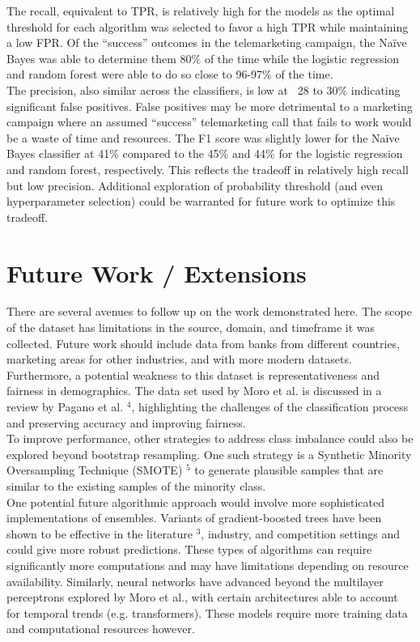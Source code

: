 \documentclass[11pt]{article}
\begin{document}
The recall, equivalent to TPR, is relatively high for the models as the optimal threshold for each algorithm was selected to favor a high TPR while maintaining a low FPR. Of the “success” outcomes in the telemarketing campaign, the Naïve Bayes was able to determine them 80\% of the time while the logistic regression and random forest were able to do so close to 96-97\% of the time. \\

The precision, also similar across the classifiers, is low at ~28 to 30\% indicating significant false positives. False positives may be more detrimental to a marketing campaign where an assumed “success” telemarketing call that fails to work would be a waste of time and resources. The F1 score was slightly lower for the Naïve Bayes classifier at 41\% compared to the 45\% and 44\% for the logistic regression and random forest, respectively. This reflects the tradeoff in relatively high recall but low precision. Additional exploration of probability threshold (and even hyperparameter selection) could be warranted for future work to optimize this tradeoff. 

\section{Future Work / Extensions }
\label{SS:6}
There are several avenues to follow up on the work demonstrated here. The scope of the dataset has limitations in the source, domain, and timeframe it was collected. Future work should include data from banks from different countries, marketing areas for other industries, and with more modern datasets. Furthermore, a potential weakness to this dataset is representativeness and fairness in demographics. The data set used by Moro et al. is discussed in a review by Pagano et al. $^4$, highlighting the  challenges of the classification process and preserving accuracy and improving fairness.\\

To improve performance, other strategies to address class imbalance could also be explored beyond bootstrap resampling. One such strategy is a Synthetic Minority Oversampling Technique (SMOTE) $^5$ to generate plausible samples that are similar to the existing samples of the minority class. \\


One potential future algorithmic approach would involve more sophisticated implementations of ensembles. Variants of gradient-boosted trees have been shown to be effective in the literature $^3$, industry, and competition settings and could give more robust predictions. These types of algorithms can require significantly more computations and may have limitations depending on resource availability. Similarly, neural networks have advanced beyond the multilayer perceptrons explored by Moro et al., with certain architectures able to account for temporal trends (e.g. transformers). These models require more training data and computational resources however.
\end{document}
